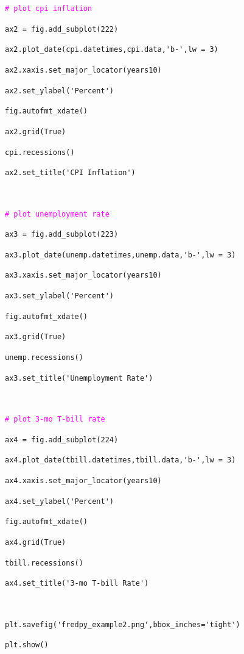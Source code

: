 \documentclass[11pt,fleqn]{article}
\newcommand{\ttt}{\texttt}
\newcommand{\tc}{\textcolor}
\begin{document}
\begin{minipage}{6.5in}
\ttt{\tc{Magenta}{\# plot cpi inflation}}

\verb!ax2 = fig.add_subplot(222)!

\verb!ax2.plot_date(cpi.datetimes,cpi.data,'b-',lw = 3)!

\verb!ax2.xaxis.set_major_locator(years10)!

\verb!ax2.set_ylabel('Percent')!

\verb!fig.autofmt_xdate()!

\ttt{ax2.grid(True)}

\ttt{cpi.recessions()}

\verb!ax2.set_title('CPI Inflation')!

\

\end{minipage}

\begin{minipage}{6.5in}
\ttt{\tc{Magenta}{\# plot unemployment rate}}

\verb!ax3 = fig.add_subplot(223)!

\verb!ax3.plot_date(unemp.datetimes,unemp.data,'b-',lw = 3)!

\verb!ax3.xaxis.set_major_locator(years10)!

\verb!ax3.set_ylabel('Percent')!

\verb!fig.autofmt_xdate()! 

\ttt{ax3.grid(True)}

\ttt{unemp.recessions()}

\verb!ax3.set_title('Unemployment Rate')!

\

\end{minipage}

\begin{minipage}{6.5in}
\ttt{\tc{Magenta}{\# plot 3-mo T-bill rate}}

\verb!ax4 = fig.add_subplot(224)!

\verb!ax4.plot_date(tbill.datetimes,tbill.data,'b-',lw = 3)!

\verb!ax4.xaxis.set_major_locator(years10)!

\verb!ax4.set_ylabel('Percent')!

\verb!fig.autofmt_xdate()!

\ttt{ax4.grid(True)}

\ttt{tbill.recessions()}

\verb!ax4.set_title('3-mo T-bill Rate')!

\

\verb!plt.savefig('fredpy_example2.png',bbox_inches='tight')!

\ttt{plt.show()}

\

\end{minipage}
\end{document}
